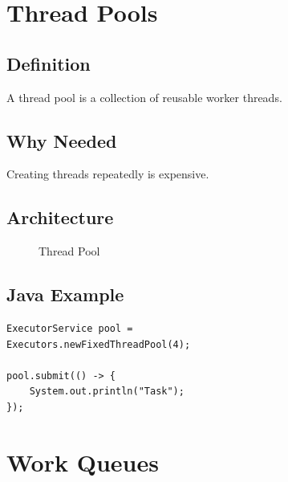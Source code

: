 \section{Thread Pools}

\subsection{Definition}

A thread pool is a collection of reusable worker threads.

\subsection{Why Needed}

Creating threads repeatedly is expensive.

\subsection{Architecture}

\begin{figure}[h]
\centering
{}
\caption{Thread Pool}
\end{figure}

\subsection{Java Example}

\begin{verbatim}
ExecutorService pool =
Executors.newFixedThreadPool(4);

pool.submit(() -> {
    System.out.println("Task");
});
\end{verbatim}

\section{Work Queues}

